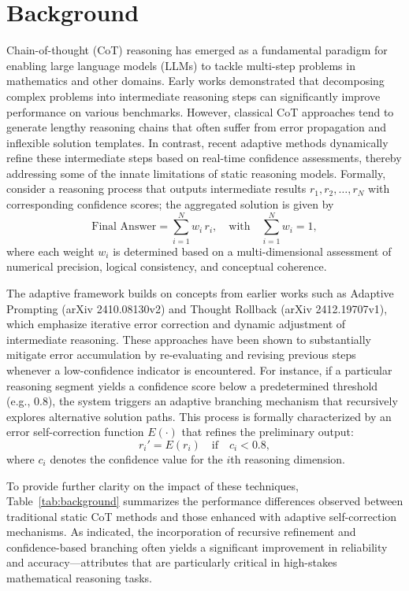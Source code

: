 \documentclass{article}
\begin{document}
\section{Background}
Chain-of-thought (CoT) reasoning has emerged as a fundamental paradigm for enabling large language models (LLMs) to tackle multi-step problems in mathematics and other domains. Early works demonstrated that decomposing complex problems into intermediate reasoning steps can significantly improve performance on various benchmarks. However, classical CoT approaches tend to generate lengthy reasoning chains that often suffer from error propagation and inflexible solution templates. In contrast, recent adaptive methods dynamically refine these intermediate steps based on real-time confidence assessments, thereby addressing some of the innate limitations of static reasoning models. Formally, consider a reasoning process that outputs intermediate results \( r_1, r_2, \ldots, r_N \) with corresponding confidence scores; the aggregated solution is given by 
\[
\text{Final Answer} = \sum_{i=1}^{N} w_i \, r_i, \quad \text{with} \quad \sum_{i=1}^{N} w_i = 1,
\]
where each weight \( w_i \) is determined based on a multi-dimensional assessment of numerical precision, logical consistency, and conceptual coherence.

The adaptive framework builds on concepts from earlier works such as Adaptive Prompting (arXiv 2410.08130v2) and Thought Rollback (arXiv 2412.19707v1), which emphasize iterative error correction and dynamic adjustment of intermediate reasoning. These approaches have been shown to substantially mitigate error accumulation by re-evaluating and revising previous steps whenever a low-confidence indicator is encountered. For instance, if a particular reasoning segment yields a confidence score below a predetermined threshold (e.g., \(0.8\)), the system triggers an adaptive branching mechanism that recursively explores alternative solution paths. This process is formally characterized by an error self-correction function \( E(\cdot) \) that refines the preliminary output:
\[
r_i' = E(r_i) \quad \text{if} \quad c_i < 0.8,
\]
where \( c_i \) denotes the confidence value for the \(i\)th reasoning dimension.

To provide further clarity on the impact of these techniques, Table~\ref{tab:background} summarizes the performance differences observed between traditional static CoT methods and those enhanced with adaptive self-correction mechanisms. As indicated, the incorporation of recursive refinement and confidence-based branching often yields a significant improvement in reliability and accuracy—attributes that are particularly critical in high-stakes mathematical reasoning tasks.
\end{document}
